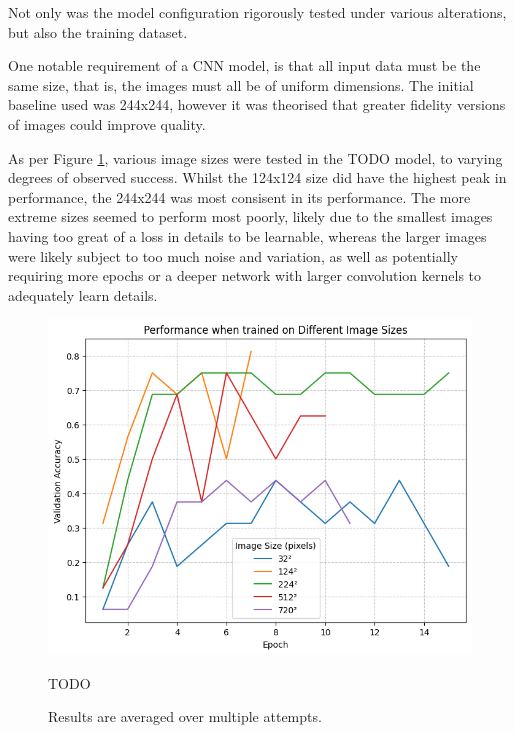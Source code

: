                         Not only was the model configuration rigorously tested under various alterations, but also the training dataset.
    
                        One notable requirement of a CNN model, is that all input data must be the same size, that is, the images must all be of uniform dimensions. The initial baseline used was 244x244, however it was theorised that greater fidelity versions of images could improve quality.
    
                        As per Figure \ref{fig:CNNSize_Perf}, various image sizes were tested in the TODO model, to varying degrees of observed success. Whilst the 124x124 size did have the highest peak in performance, the 244x244 was most consisent in its performance. The more extreme sizes seemed to perform most poorly, likely due to the smallest images having too great of a loss in details to be learnable, whereas the larger images were likely subject to too much noise and variation, as well as potentially requiring more epochs or a deeper network with larger convolution kernels to adequately learn details.
            
                        \begin{figure}[h]
                            \centering
                            \includegraphics[width=\textwidth]{images/CNNSize_Perf.png}
                            \caption{TODO}
                            \label{fig:CNNSize_Perf}
                            \caption*{Results are averaged over multiple attempts.}
                        \end{figure}
    
